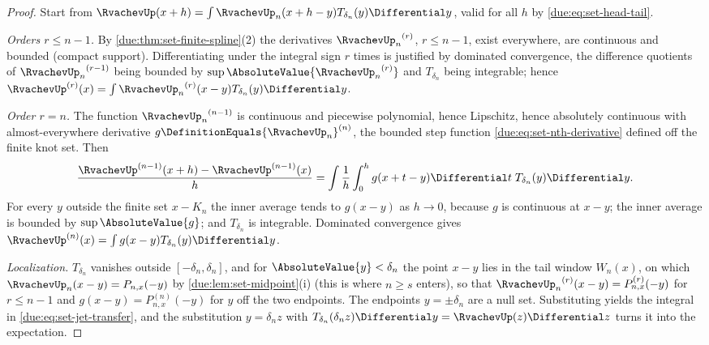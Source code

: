 \documentclass[11pt,oneside]{article}
\theoremstyle{plain}
\theoremstyle{definition}
\theoremstyle{remark}
\newcommand{\upn}[1]{\RvachevUp_{#1}}
\begin{document}
\begin{proof}
Start from $\RvachevUp(x+h)=\int\upn{n}(x+h-y)T_{\delta_n}(y)\Differential y$,
valid for all $h$ by \cref{due:eq:set-head-tail}.

\emph{Orders $r\le n-1$.}  By \cref{due:thm:set-finite-spline}(2) the
derivatives ${\upn{n}}^{(r)}$, $r\le n-1$, exist everywhere, are continuous
and bounded (compact support).  Differentiating under the integral sign
$r$ times is justified by dominated convergence, the difference quotients
of ${\upn{n}}^{(r-1)}$ being bounded by $\sup\AbsoluteValue{{\upn{n}}^{(r)}}$
and $T_{\delta_n}$ being integrable; hence
$\RvachevUp^{(r)}(x)=\int{\upn{n}}^{(r)}(x-y)T_{\delta_n}(y)\Differential y$.

\emph{Order $r=n$.}  The function ${\upn{n}}^{(n-1)}$ is continuous and
piecewise polynomial, hence Lipschitz, hence absolutely continuous with
almost-everywhere derivative $g\DefinitionEquals{\upn{n}}^{(n)}$, the
bounded step function \cref{due:eq:set-nth-derivative} defined off the
finite knot set.  Then
\[
 \frac{\RvachevUp^{(n-1)}(x+h)-\RvachevUp^{(n-1)}(x)}{h}
 =\int\frac1h\int_{0}^{h}g(x+t-y)\Differential t\;T_{\delta_n}(y)\Differential y .
\]
For every $y$ outside the finite set $x-K_n$ the inner average tends to
$g(x-y)$ as $h\to0$, because $g$ is continuous at $x-y$; the inner average
is bounded by $\sup\AbsoluteValue{g}$; and $T_{\delta_n}$ is integrable.
Dominated convergence gives
$\RvachevUp^{(n)}(x)=\int g(x-y)T_{\delta_n}(y)\Differential y$.

\emph{Localization.}  $T_{\delta_n}$ vanishes outside $[-\delta_n,\delta_n]$,
and for $\AbsoluteValue{y}<\delta_n$ the point $x-y$ lies in the tail window
$W_n(x)$, on which $\upn{n}(x-y)=P_{n,x}(-y)$ by
\cref{due:lem:set-midpoint}(i) (this is where $n\ge s$ enters), so that
${\upn{n}}^{(r)}(x-y)=P_{n,x}^{(r)}(-y)$ for $r\le n-1$ and
$g(x-y)=P_{n,x}^{(n)}(-y)$ for $y$ off the two endpoints.  The endpoints
$y=\pm\delta_n$ are a null set.  Substituting yields the integral in
\cref{due:eq:set-jet-transfer}, and the substitution $y=\delta_n z$ with
$T_{\delta_n}(\delta_nz)\Differential y=\RvachevUp(z)\Differential z$
turns it into the expectation.
\end{proof}
\end{document}
